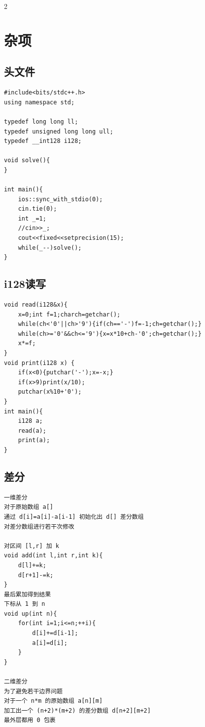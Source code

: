 \documentclass[10pt,a4paper]{article}
\begin{document}
\tableofcontents
\newpage

\begin{multicols*}{2}


\section{杂项}
\subsection{头文件}
\begin{lstlisting}
#include<bits/stdc++.h>
using namespace std;

typedef long long ll;
typedef unsigned long long ull;
typedef __int128 i128;

void solve(){
}

int main(){
    ios::sync_with_stdio(0);
    cin.tie(0);
    int _=1;
    //cin>>_;
    cout<<fixed<<setprecision(15);
    while(_--)solve();
}
\end{lstlisting}
\subsection{i128读写}
\begin{lstlisting}
void read(i128&x){
    x=0;int f=1;charch=getchar();
    while(ch<'0'||ch>'9'){if(ch=='-')f=-1;ch=getchar();}
    while(ch>='0'&&ch<='9'){x=x*10+ch-'0';ch=getchar();}
    x*=f;
}
void print(i128 x) {
    if(x<0){putchar('-');x=-x;}
    if(x>9)print(x/10);
    putchar(x%10+'0');
}
int main(){
    i128 a;
    read(a);
    print(a);
}
\end{lstlisting}
\subsection{差分}
\begin{lstlisting}
一维差分
对于原始数组 a[]
通过 d[i]=a[i]-a[i-1] 初始化出 d[] 差分数组
对差分数组进行若干次修改

对区间 [l,r] 加 k
void add(int l,int r,int k){
    d[l]+=k;
    d[r+1]-=k;
}
最后累加得到结果
下标从 1 到 n
void up(int n){
    for(int i=1;i<=n;++i){
        d[i]+=d[i-1];
        a[i]=d[i];
    }
}

二维差分
为了避免若干边界问题
对于一个 n*m 的原始数组 a[n][m]
加工出一个 (n+2)*(m+2) 的差分数组 d[n+2][m+2]
最外层都用 0 包裹


\end{lstlisting}
\end{multicols*}
\end{document}
